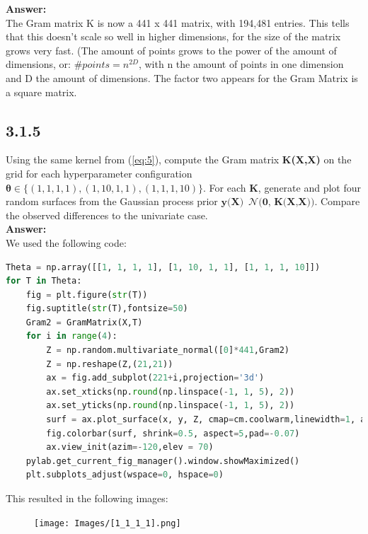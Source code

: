\documentclass[a4paper]{article}
\begin{document}
\textbf{Answer:}\\

The Gram matrix K is now a 441 x 441 matrix, with 194,481 entries. This tells that this doesn't scale so well in higher dimensions, for the size of the matrix grows very fast. (The amount of points grows to the power of the amount of dimensions, or: $\#points = n^{2D}$, with n the amount of points in one dimension and D the amount of dimensions. The factor two appears for the Gram Matrix is a square matrix. 






\subsection*{3.1.5}

Using the same kernel from (\ref{eq:5}), compute the Gram matrix \textbf{K(X,X)} on the grid for each hyperparameter configuration $\boldsymbol{\theta} \in \{(1, 1, 1, 1), (1, 10, 1, 1), (1, 1, 1, 10)\}$. For each \textbf{K}, generate and plot four random surfaces from the Gaussian process prior $\textbf{y(X)} $~$ \mathcal{N}\textbf{(0, K(X,X)})$. Compare the observed differences to the univariate case.\\


\textbf{Answer:}\\


We used the following code:


\begin{lstlisting}[language=Python]
Theta = np.array([[1, 1, 1, 1], [1, 10, 1, 1], [1, 1, 1, 10]])
for T in Theta:
    fig = plt.figure(str(T))
    fig.suptitle(str(T),fontsize=50)
    Gram2 = GramMatrix(X,T)
    for i in range(4):     
        Z = np.random.multivariate_normal([0]*441,Gram2)
        Z = np.reshape(Z,(21,21))
        ax = fig.add_subplot(221+i,projection='3d')
        ax.set_xticks(np.round(np.linspace(-1, 1, 5), 2))
        ax.set_yticks(np.round(np.linspace(-1, 1, 5), 2))
        surf = ax.plot_surface(x, y, Z, cmap=cm.coolwarm,linewidth=1, antialiased=True)
        fig.colorbar(surf, shrink=0.5, aspect=5,pad=-0.07)
        ax.view_init(azim=-120,elev = 70)
    pylab.get_current_fig_manager().window.showMaximized()
    plt.subplots_adjust(wspace=0, hspace=0)
\end{lstlisting}






This resulted in the following images:
\begin{figure}[H]
\texttt{[image: Images/[1\_1\_1\_1].png]}
\end{figure}
\end{document}
